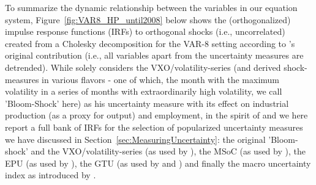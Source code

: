 \documentclass[a4paper,11pt,listof=nochaptergap,oneside,pointednumbers,bibtotoc,bigheadings,liststotoc]{scrbook}
\begin{document}
To summarize the dynamic relationship between the variables in our equation system, Figure~\ref{fig:VAR8_HP_until2008} below shows the (orthogonalized) impulse response functions (IRFs) to orthogonal shocks (i.e., uncorrelated) created from a Cholesky decomposition for the VAR-8 setting according to \citet{bloom:09}'s original contribution (i.e., all variables apart from the uncertainty measures are detrended). While \citet{bloom:09} solely considers the VXO/volatility-series (and derived shock-measures in various flavors - one of which, the month with the maximum volatility in a series of months with extraordinarily high volatility, we call 'Bloom-Shock' here) as his uncertainty measure with its effect on industrial production (as a proxy for output) and employment, in the spirit of \citet{juradoetal:15} and \citet{bontempietal:16} we here report a full bank of IRFs for the selection of popularized uncertainty measures we have discussed in Section~\ref{sec:MeasuringUncertainty}: the original 'Bloom-shock' and the VXO/volatility-series (as used by \citealp{bloom:09}), the MSoC (as used by \citealp{leducandliu:16}), the EPU (as used by \citealp{bakeretal:15}), the GTU (as used by \citealp{bontempietal:16} and \citealp{castelnuovoandtran:17}) and finally the macro uncertainty index as introduced by \citet{juradoetal:15}.
\end{document}
